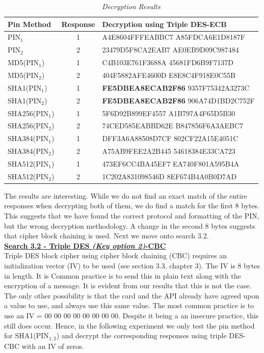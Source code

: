 \documentclass[bsc,frontabs,twoside,singlespacing,parskip,deptreport]{infthesis}     %
\begin{document}
\begin{table}[H]
\begin{tabular}{|l|c|l|}
\hline
Pin Method & Response & Decryption using Triple DES-ECB\\
\hline
PIN$_1$ & 1 & A4E8604FFFEABBC7 A85FDCA6E1D8187F \\
PIN$_2$ & 2 & 23479D5F8CA2EAB7 AE0EB9D09C987484 \\
\hline
MD5(PIN$_1$) & 1 & C4B103E761F3688A 45681FD6B9F7137D \\
MD5(PIN$_2$) & 2 & 404F5882AFE4600D E8E8C4F918E0C55B \\    
\hline
SHA1(PIN$_1$) & 1 & \textbf{FE5DBEA8ECAB2F86} 9357F75342A3273C\\
SHA1(PIN$_2$) & 2 &\textbf{FE5DBEA8ECAB2F86} 906A74D1BD2C752F\\
\hline
SHA256(PIN$_1$) & 1 & 5F6D92B899EF4557 A1B797A4F65D5B30\\
SHA256(PIN$_2$)& 2 & 74CED585EABBD62E B847856F6A3AEBC7 \\
\hline
SHA384(PIN$_1$) & 1 & DFF3A6A88508D7CF 802CF22A15E4051C \\
SHA384(PIN$_2$)& 2 & A75AB9FEE2A2B445 54618384E33CA723 \\
\hline
SHA512(PIN$_1$) & 1 & 473EF6CC4BA45EF7 EA740F801A595B4A \\
SHA512(PIN$_2$)& 2 & 1C202A831098546D 8EF674B4A0B0D7AD \\
\hline
\end{tabular}
\caption{\textit{Decryption Results}}
\end{table}

The results are interesting. While we do not find an exact match of the entire responses when decrypting both of them, we do find a match for the first 8 bytes. This suggests that we have found the correct protocol and formatting of the PIN, but the wrong decryption methodology. A change in the second 8 bytes suggests that cipher block chaining is used. Next we move onto search 3.2.\\

\textbf{\underline{Search 3.2 - Triple DES \textit{(Key option 2)}-CBC}}\\
Triple DES block cipher using cipher block chaining (CBC) requires an initialization vector (IV) to be used (see section 3.3, chapter 3). The IV is 8 bytes in length. It is Common practice is to send this in plain text along with the encryption of a message. It is evident from our results that this is not the case. The only other possibility is that the card and the API already have agreed upon a value to use, and always use this same value. The most common practice is to use an IV = 00 00 00 00 00 00 00 00. Despite it being a an insecure practice, this still does occur. Hence, in the following experiment we only test the pin method for SHA1(PIN$_{1,2}$) and decrypt the corresponding responses using triple DES-CBC with an IV of zeros.
\end{document}
